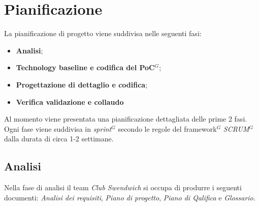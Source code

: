 \section{Pianificazione}
La pianificazione di progetto viene suddivisa nelle seguenti fasi:
\begin{itemize}
    \item \textbf{Analisi};
    \item \textbf{Technology baseline e codifica del PoC$^{G}$};
    \item \textbf{Progettazione di dettaglio e codifica};
    \item \textbf{Verifica validazione e collaudo}
\end{itemize} 
Al momento viene presentata una pianificazione dettagliata delle prime 2 fasi. Ogni fase viene suddivisa in \textit{sprint}$^{G}$ secondo le regole
del framework$^{G}$ \textit{SCRUM}$^{G}$ dalla durata di circa 1-2 settimane. 

\subsection{Analisi}
Nella fase di analisi il team \textit{Club Swendwich} si occupa di produrre i seguenti documenti: \textit{Analisi dei requisiti}, \textit{Piano di progetto}, \textit{Piano di Qalifica} e \textit{Glossario}.

